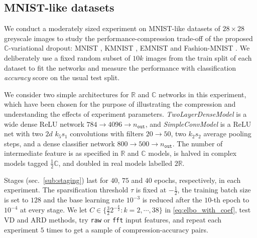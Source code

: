 \documentclass[a4paper,10pt,twocolumn]{article}
\newcommand{\real}{\mathbb{R}}
\newcommand{\cplx}{\mathbb{C}}
\begin{document}


\subsection{MNIST-like datasets} %
\label{sub:mnist_like_datasets}

We conduct a moderately sized experiment on MNIST-like datasets of $28\times 28$ greyscale
images to study the performance-compression trade-off of the proposed $\cplx$-variational
dropout: MNIST \citep{lecun_gradient-based_1998}, KMNIST \citep{clanuwat_deep_2018},
EMNIST \citep{cohen_emnist_2017} and Fashion-MNIST \citep{xiao_fashion-mnist_2017}.
%
We deliberately use a {fixed} random subset of $10k$ images from the train split of each
dataset to fit the networks and measure the performance with classification \emph{accuracy}
score on the usual test split.

We consider two simple architectures for $\real$ and $\cplx$ networks in this experiment,
which have been chosen for the purpose of illustrating the compression and understanding
the effects of experiment parameters. \emph{TwoLayerDenseModel} is a wide dense ReLU
network $784 \to 4096 \to n_\mathtt{out}$, and \emph{SimpleConvModel} is a ReLU net with
two $2d$ $k_5 s_1$ convolutions with filters $20 \to 50$, two $k_2 s_2$ average pooling steps,
and a dense classifier network $800 \to 500 \to n_\mathtt{out}$. The number of intermediate
feature is as specified in $\real$ and $\cplx$ models, is halved in complex models tagged
$\tfrac12\cplx$, and doubled in real models labelled $2\real$.

Stages (sec.~\ref{sub:staging}) last for $40$, $75$ and $40$ epochs, respectively, in each
experiment. The sparsification threshold $\tau$ is fixed at $-\tfrac12$, the training batch
size is set to $128$ and the base learning rate ${10}^{-3}$ is reduced after the $10$-th epoch
to ${10}^{-4}$ at every stage.
%
We let $
  C \in \{
    \tfrac32 2^{-\tfrac{k}2} \colon k=2, \cdots, 38
  \}
$ in \eqref{eq:elbo_with_coef}, test VD and ARD methods, try \texttt{raw} or \texttt{fft}
input features, and repeat each experiment $5$ times to get a sample of compression-accuracy
pairs.
\end{document}
